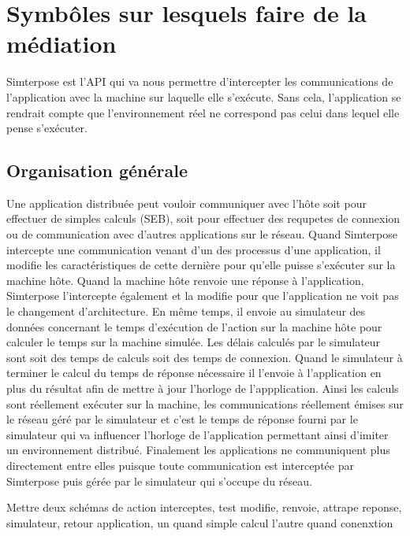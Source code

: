 \section{Symbôles sur lesquels faire de la médiation}
\label{section:simterpose}
Simterpose est l'API qui va nous permettre d'intercepter les communications de
l'application avec la machine sur laquelle elle s'exécute. Sans cela,
l'application se rendrait compte que l'environnement réel ne correspond pas
celui dans lequel elle pense s'exécuter.

\subsection{Organisation générale}
 Une application distribuée peut vouloir communiquer avec l'hôte soit pour
 effectuer de simples calculs (SEB), soit pour effectuer des requpetes de
 connexion ou de communication avec d'autres applications sur le réseau. Quand
 Simterpose intercepte une communication venant d'un des processus d'une
 application, il modifie les caractéristiques de cette dernière pour qu'elle
 puisse s'exécuter sur la machine hôte. Quand la machine hôte renvoie une
 réponse à l'application, Simterpose l'intercepte également et la modifie pour
 que l'application ne voit pas le changement d'architecture. En même temps, il
 envoie au simulateur des données concernant le temps d'exécution de l'action
 sur la machine hôte pour calculer le temps sur la machine simulée. Les délais
 calculés par le simulateur sont soit des temps de calculs soit des temps de
 connexion. Quand le simulateur à terminer le calcul du temps de réponse
 nécessaire il l'envoie à l'application en plus du résultat afin de mettre à
 jour l'horloge de l'appplication. Ainsi les calculs sont réellement exécuter
 sur la machine, les communications réellement émises sur le réseau géré par le
 simulateur et c'est le temps de réponse fourni par le simulateur qui va
 influencer l'horloge de l'application permettant ainsi d'imiter un
 environnement distribué. Finalement les applications ne communiquent plus
 directement entre elles puisque toute communication est interceptée par
 Simterpose puis gérée par le simulateur qui s'occupe du réseau.

{\color{red} Mettre deux schémas de action interceptes, test modifie, renvoie,
  attrape reponse, simulateur, retour application, un quand simple calcul l'autre quand conenxtion}

